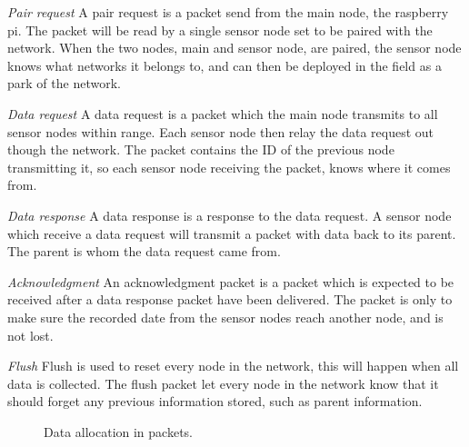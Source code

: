 \textit{Pair request}\newline
A pair request is a packet send from the main node, the raspberry pi.
The packet will be read by a single sensor node set to be paired with the network.
When the two nodes, main and sensor node, are paired, the sensor node knows what networks it belongs to, and can then be deployed in the field as a park of the network. 

\textit{Data request}\newline
A data request is a packet which the main node transmits to all sensor nodes within range.
Each sensor node then relay the data request out though the network.
The packet contains the ID of the previous node transmitting it, so each sensor node receiving the packet, knows where it comes from.

\textit{Data response}\newline
A data response is a response to the data request.
A sensor node which receive a data request will transmit a packet with data back to its parent.
The parent is whom the data request came from.

\textit{Acknowledgment}\newline
An acknowledgment packet is a packet which is expected to be received after a data response packet have been delivered.
The packet is only to make sure the recorded date from the sensor nodes reach another node, and is not lost.

\textit{Flush}\newline
Flush is used to reset every node in the network, this will happen when all data is collected.
The flush packet let every node in the network know that it should forget any previous information stored, such as parent information.

\begin{figure}[h!]
	\centering
	\caption{Data allocation in packets.}
	\label{fig:dataalloc}
\end{figure}

